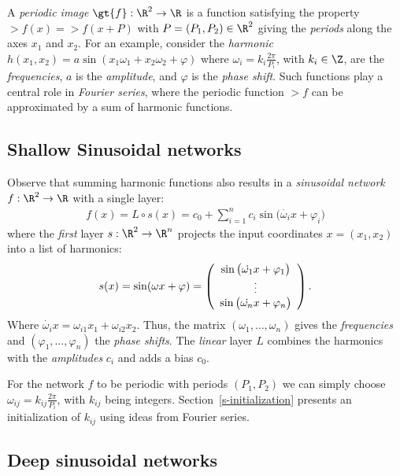 A \textit{periodic image} $\gt{f}:\R^2\to \R$ is a function satisfying the property $\gt{f}(x) \!=\! \gt{f}(x + P)$ with $P=(P_1, P_2)\in \R^2$ giving the \textit{periods} along the axes $x_1$ and $x_2$.
For an example, consider the \textit{harmonic} $h(x_1, x_2)=a\sin(x_1\omega_1+x_2\omega_2+ \varphi)$ where $\omega_i\!=\!k_i\frac{2\pi}{P_i}$, with $k_i\in\Z$, are the \textit{frequencies}, $a$ is the \textit{amplitude}, and $\varphi$ is the \textit{phase shift}.
Such functions play a central role in \textit{Fourier series}, where the periodic function $\gt{f}$ can be approximated by a sum of harmonic functions.


\subsection{Shallow Sinusoidal networks}
Observe that summing harmonic functions also results in a \textit{sinusoidal network} $f:\R^2\to \R$ with a single layer:
\begin{align}\label{e-fourier_series}
    f(x) = L\circ s(x) =  c_0 + \sum_{i=1}^{n} c_i  \sin\Big(\dot{\omega_i}{ x}+ \varphi_i\Big)
\end{align}
where the \textit{first} layer $s:\R^2\to \R^{n}$ projects the input coordinates $x=(x_1,x_2)$ into a list of harmonics:
\begin{align}\label{e-firstlayer}
\displaystyle
    s(x)=\sin(\omega x +\varphi)=
    \left(
    \begin{array}{c}
        \sin\big(\dot{\omega_1}{x}+\varphi_1\big)\\
         {\footnotesize\vdots}\\
         \sin\big(\dot{\omega_{n}}{x}+\varphi_{n}\big)
    \end{array}
    \right).
\end{align}
Where $\dot{\omega_i}{x}=\omega_{i1}x_1+\omega_{i2}x_2$. Thus, the matrix $(\omega_1, \ldots, \omega_{n})$ gives the \textit{frequencies} and $(\varphi_1, \ldots, \varphi_{n})$ the \textit{phase shifts}.
The \textit{linear} layer $L$ combines the harmonics with the \textit{amplitudes} $c_i$ and adds a bias $c_0$.

For the network $f$ to be periodic with periods $(P_1,P_2)$ we can simply choose $\omega_{ij}=k_{ij}\frac{2\pi}{P_i}$, with $k_{ij}$ being integers.
Section~\ref{s-initialization} presents an initialization of $k_{ij}$ using ideas from Fourier series.

\subsection{Deep sinusoidal networks}\label{s-deep-networks}

